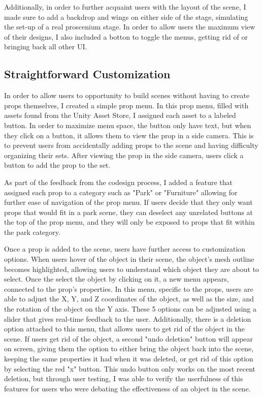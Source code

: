 \documentclass[10pt,twocolumn]{article}
\begin{document}
Additionally, in order to further acquaint users with the layout of the scene, I made sure to add a backdrop and wings on either side of the stage, simulating the set-up of a real proscenium stage. In order to allow users the maximum view of their designs, I also included a botton to toggle the menus, getting rid of or bringing back all other UI. 
\subsection{Straightforward Customization}
In order to allow users to opportunity to build scenes without having to create props themselves, I created a simple prop menu. In this prop menu, filled with assets found from the Unity Asset Store, I assigned each asset to a labeled button. In order to maximize menu space, the button only have text, but when they click on a button, it allows them to view the prop in a side camera. This is to prevent users from accidentally adding props to the scene and having difficulty organizing their sets. After viewing the prop in the side camera, users click a button to add the prop to the set.

As part of the feedback from the codesign process, I added a feature that assigned each prop to a category such as "Park" or "Furniture" allowing for further ease of navigation of the prop menu. If users decide that they only want props that would fit in a park scene, they can deselect any unrelated buttons at the top of the prop menu, and they will only be exposed to props that fit within the park category. 

Once a prop is added to the scene, users have further access to customization options. When users hover of the object in their scene, the object's mesh outline becomes highlighted, allowing users to understand which object they are about to select. Once the select the object by clicking on it, a new menu appears, connected to the prop's properties. In this menu, specific to the props, users are able to adjust the X, Y, and Z coordinates of the object, as well as the size, and the rotation of the object on the Y axis. These 5 options can be adjusted using a slider that gives real-time feedback to the user. Additionally, there is a deletion option attached to this menu, that allows users to get rid of the object in the scene. If users get rid of the object, a second "undo deletion" button will appear on screen, giving them the option to either bring the object back into the scene, keeping the same properties it had when it was deleted, or get rid of this option by selecting the red "x" button. This undo button only works on the most recent deletion, but through user testing, I was able to verify the userfulness of this features for users who were debating the effectiveness of an object in the scene. 
\end{document}
